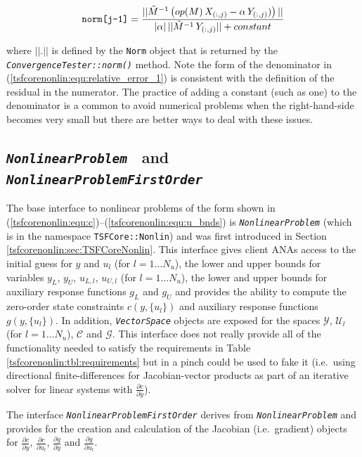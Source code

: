 \begin{equation}
\mbox{\texttt{norm[j-1]}} = \frac{ || \tilde{M}^{-1} \left( op(M)\,X_{(:,j)} - \alpha\,Y_{(:,j)} ) \right) || }
{ |\alpha|\, ||\tilde{M}^{-1}\,Y_{(:,j)}|| + constant}
\label{tsfcorenonlin:equ:relative_error_1}
\end{equation}

where $||.||$ is defined by the \texttt{Norm} object that is returned by the
\texttt{\textit{ConvergenceTester\-::norm()}} method.  Note the form of the denominator
in (\ref{tsfcorenonlin:equ:relative_error_1}) is consistent with the
definition of the residual in the numerator.  The practice of adding a
constant (such as one) to the denominator is a common to avoid
numerical problems when the right-hand-side becomes very small but
there are better ways to deal with these issues.

%
\subsection{\texttt{\textit{NonlinearProblem}} $\:$ and
\texttt{\textit{NonlinearProblemFirstOrder}}}
%

The base interface to nonlinear problems of the form shown in
(\ref{tsfcorenonlin:equ:c})--(\ref{tsfcorenonlin:equ:u_bnds}) is
\texttt{\textit{Nonlinear\-Problem}} (which is in the
namespace \texttt{TSFCore::Nonlin}) and was first introduced in
Section \ref{tsfcorenonlin:sec:TSFCoreNonlin}.  This interface gives
client ANAs access to the initial guess for $y$ and $u_l$ (for $l = 1
\ldots N_u$), the lower and upper bounds for variables $y_L$, $y_U$,
$u_{L,l}$, $u_{U,l}$ (for $l = 1 \ldots N_u$), the lower and upper
bounds for auxiliary response functions $g_L$ and $g_U$ and provides
the ability to compute the zero-order state constraints $c(y,\{u_l\})$
and auxiliary response functions $g(y,\{u_l\})$.  In addition,
\texttt{\textit{Vector\-Space}} objects are exposed for the spaces
$\mathcal{Y}$, $\mathcal{U}_l$ (for $l = 1 \ldots N_u$), $\mathcal{C}$
and $\mathcal{G}$.  This interface does not really provide all of the
functionality needed to satisfy the requirements in Table
\ref{tsfcorenonlin:tbl:requirements} but in a pinch could be used to
fake it (i.e.~using directional finite-differences for Jacobian-vector
products as part of an iterative solver for linear systems with
$\frac{\partial c}{\partial y}$).

The interface \texttt{\textit{Nonlinear\-Problem\-First\-Order}}
derives from \texttt{\textit{Nonlinear\-Problem}} and provides for the
creation and calculation of the Jacobian (i.e.~gradient) objects for
$\frac{\partial c}{\partial y}$, $\frac{\partial c}{\partial u_l}$,
$\frac{\partial g}{\partial y}$ and $\frac{\partial g}{\partial u_l}$.

